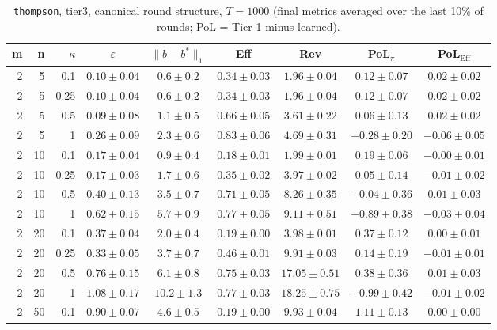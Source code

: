 \begin{table}[htbp]
\centering
\scriptsize
\caption{\texttt{thompson}, tier3, canonical round structure, $T=1000$ (final metrics averaged over the last 10\% of rounds; PoL = Tier-1 minus learned).}
\label{tab:tier3_thompson_canonical}
\begin{tabular}{@{}rrrcccccc@{}}
\toprule
m & n & $\kappa$ & $\varepsilon$ & $\|b-b^*\|_1$ & Eff & Rev & PoL$_\pi$ & PoL$_\mathrm{Eff}$ \\
\midrule
2 & 5 & 0.1 & $0.10 \pm 0.04$ & $0.6 \pm 0.2$ & $0.34 \pm 0.03$ & $1.96 \pm 0.04$ & $0.12 \pm 0.07$ & $0.02 \pm 0.02$ \\
2 & 5 & 0.25 & $0.10 \pm 0.04$ & $0.6 \pm 0.2$ & $0.34 \pm 0.03$ & $1.96 \pm 0.04$ & $0.12 \pm 0.07$ & $0.02 \pm 0.02$ \\
2 & 5 & 0.5 & $0.09 \pm 0.08$ & $1.1 \pm 0.5$ & $0.66 \pm 0.05$ & $3.61 \pm 0.22$ & $0.06 \pm 0.13$ & $0.02 \pm 0.02$ \\
2 & 5 & 1 & $0.26 \pm 0.09$ & $2.3 \pm 0.6$ & $0.83 \pm 0.06$ & $4.69 \pm 0.31$ & $-0.28 \pm 0.20$ & $-0.06 \pm 0.05$ \\
2 & 10 & 0.1 & $0.17 \pm 0.04$ & $0.9 \pm 0.4$ & $0.18 \pm 0.01$ & $1.99 \pm 0.01$ & $0.19 \pm 0.06$ & $-0.00 \pm 0.01$ \\
2 & 10 & 0.25 & $0.17 \pm 0.03$ & $1.7 \pm 0.6$ & $0.35 \pm 0.02$ & $3.97 \pm 0.02$ & $0.05 \pm 0.14$ & $-0.01 \pm 0.02$ \\
2 & 10 & 0.5 & $0.40 \pm 0.13$ & $3.5 \pm 0.7$ & $0.71 \pm 0.05$ & $8.26 \pm 0.35$ & $-0.04 \pm 0.36$ & $0.01 \pm 0.03$ \\
2 & 10 & 1 & $0.62 \pm 0.15$ & $5.7 \pm 0.9$ & $0.77 \pm 0.05$ & $9.11 \pm 0.51$ & $-0.89 \pm 0.38$ & $-0.03 \pm 0.04$ \\
2 & 20 & 0.1 & $0.37 \pm 0.04$ & $2.0 \pm 0.4$ & $0.19 \pm 0.00$ & $3.98 \pm 0.01$ & $0.37 \pm 0.12$ & $0.00 \pm 0.01$ \\
2 & 20 & 0.25 & $0.33 \pm 0.05$ & $3.7 \pm 0.7$ & $0.46 \pm 0.01$ & $9.91 \pm 0.03$ & $0.14 \pm 0.19$ & $-0.01 \pm 0.01$ \\
2 & 20 & 0.5 & $0.76 \pm 0.15$ & $6.1 \pm 0.8$ & $0.75 \pm 0.03$ & $17.05 \pm 0.51$ & $0.38 \pm 0.36$ & $0.01 \pm 0.03$ \\
2 & 20 & 1 & $1.08 \pm 0.17$ & $10.2 \pm 1.3$ & $0.77 \pm 0.03$ & $18.25 \pm 0.75$ & $-0.99 \pm 0.42$ & $-0.01 \pm 0.02$ \\
2 & 50 & 0.1 & $0.90 \pm 0.07$ & $4.6 \pm 0.5$ & $0.19 \pm 0.00$ & $9.93 \pm 0.04$ & $1.11 \pm 0.13$ & $0.00 \pm 0.00$ \\

\end{tabular}
\end{table}
